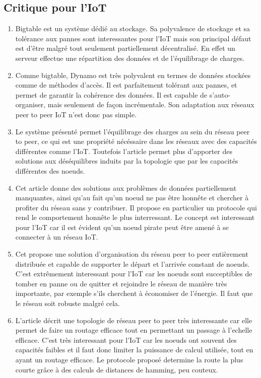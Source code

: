 \documentclass{article}
\begin{document}
\subsection{Critique pour l'IoT}
\begin{enumerate}
	\item\cite{Chang:2008:BDS:1365815.1365816}
	Bigtable est un système dédié au stockage. Sa polyvalence de stockage et sa tolérance aux pannes sont interessantes pour l'IoT mais	son principal défaut est d'être malgré tout seulement partiellement décentralisé. En effet un serveur effectue une répartition des données et de l'équilibrage de charges.

	\item\cite{DeCandia:2007:DAH:1323293.1294281} Comme bigtable, Dynamo est très polyvalent en termes de données stockées comme de méthodes d'accès. Il est parfaitement tolérant aux pannes, et permet de garantir la cohérence
	des données. Il est capable de s'auto-organiser, mais seulement de façon incrémentale. Son adaptation aux réseaux peer to peer IoT n'est donc pas simple.

	\item\cite{karger2003new}Le système présenté permet l'équilibrage des charges au sein du réseau peer to peer, ce
	qui est une propriété nécéssaire dans les réseaux avec des capacités différentes comme l'IoT. Toutefois l'article permet plus d'apporter des solutions aux déséquilibres induits par la topologie que par les capacités
	différentes des noeuds.

	\item\cite{6858091}Cet article donne des solutions aux problèmes de données partiellement manquantes, ainsi qu'au fait qu'un noeud ne pas être honnête et chercher à profiter du réseau sans y contribuer. Il propose en particulier un protocole qui rend le comportement honnête le plus interressant. Le concept est interessant pour l'IoT car il est évident qu'un noeud pirate peut être amené à se connecter à un réseau IoT.

	\item\cite{7354403}Cet propose une solution d'organisation du réseau peer to peer entièrement distribuée et
	capable de supporter le départ et l'arrivée constant de noeuds. C'est extrêmement interessant pour l'IoT car
	les noeuds sont succeptibles de tomber en panne ou de quitter et rejoindre le réseau de manière très importante, par exemple s'ils cherchent à économiser de l'énergie. Il faut que le réseau soit robuste malgré cela.

	\item\cite{Toce:2017:EHL:3050924.3051046}L'article décrit une topologie de réseau peer to peer très interessante
	car elle permet de faire un routage efficace tout en permettant un passage à l'echelle efficace. C'est très interessant pour l'IoT car les noeuds ont souvent des capacités faibles et il faut donc limiter la puissance
	de calcul utilisée, tout en ayant un routage efficace. Le protocole proposé determine la route la plus courte
	grâce à des calculs de distances de hamming, peu couteux.


\end{enumerate}
\end{document}

